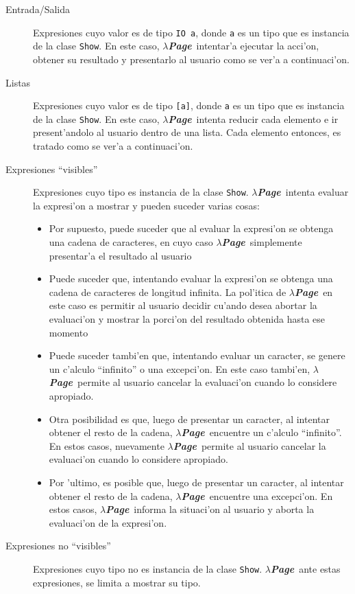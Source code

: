 \documentclass[a4paper]{article}
\newcommand{\hpage}{\textbf{\textsl{$\lambda$Page}}}
\begin{document}
\begin{description}
	\item[Entrada/Salida] Expresiones cuyo valor es de tipo \texttt{IO a}, donde \texttt{a} es un tipo que es instancia de la clase \texttt{Show}.  En este caso, \hpage\ intentar'a ejecutar la acci'on, obtener su resultado y presentarlo al usuario como se ver'a a continuaci'on.
	\item[Listas] Expresiones cuyo valor es de tipo \texttt{[a]}, donde \texttt{a} es un tipo que es instancia de la clase \texttt{Show}.  En este caso, \hpage\ intenta reducir cada elemento e ir present'andolo al usuario dentro de una lista.  Cada elemento entonces, es tratado como se ver'a a continuaci'on.
	\item[Expresiones ``visibles''] Expresiones cuyo tipo es instancia de la clase \texttt{Show}.  \hpage\ intenta evaluar la expresi'on a mostrar y pueden suceder varias cosas:
		\begin{itemize}
			\item Por supuesto, puede suceder que al evaluar la expresi'on se obtenga una cadena de caracteres, en cuyo caso \hpage\ simplemente presentar'a el resultado al usuario
			\item Puede suceder que, intentando evaluar la expresi'on se obtenga una cadena de caracteres de longitud infinita.  La pol'itica de \hpage\ en este caso es permitir al usuario decidir cu'ando desea abortar la evaluaci'on y mostrar la porci'on del resultado obtenida hasta ese momento
			\item Puede suceder tambi'en que, intentando evaluar un caracter, se genere un c'alculo ``infinito'' o una excepci'on.  En este caso tambi'en, \hpage\ permite al usuario cancelar la evaluaci'on cuando lo considere apropiado.
			\item Otra posibilidad es que, luego de presentar un caracter, al intentar obtener el resto de la cadena, \hpage\ encuentre un c'alculo ``infinito''.  En estos casos, nuevamente \hpage\ permite al usuario cancelar la evaluaci'on cuando lo considere apropiado.
			\item Por 'ultimo, es posible que, luego de presentar un caracter, al intentar obtener el resto de la cadena, \hpage\ encuentre una excepci'on.  En estos casos, \hpage\ informa la situaci'on al usuario y aborta la evaluaci'on de la expresi'on.
		\end{itemize}
	\item[Expresiones no ``visibles''] Expresiones cuyo tipo no es instancia de la clase \texttt{Show}.  \hpage\, ante estas expresiones, se limita a mostrar su tipo.
\end{description}
\end{document}
